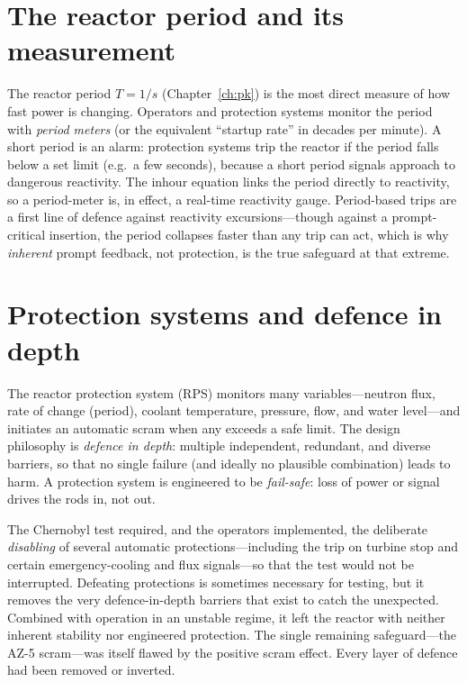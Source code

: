\section{The reactor period and its measurement}

The reactor period $T=1/s$ (Chapter~\ref{ch:pk}) is the most direct measure of how
fast power is changing. Operators and protection systems monitor the period with
\emph{period meters} (or the equivalent ``startup rate'' in decades per minute). A
short period is an alarm: protection systems trip the reactor if the period falls
below a set limit (e.g.\ a few seconds), because a short period signals approach to
dangerous reactivity. The inhour equation links the period directly to reactivity,
so a period-meter is, in effect, a real-time reactivity gauge. Period-based trips
are a first line of defence against reactivity excursions---though against a
prompt-critical insertion, the period collapses faster than any trip can act, which
is why \emph{inherent} prompt feedback, not protection, is the true safeguard at
that extreme.

\section{Protection systems and defence in depth}

The reactor protection system (RPS) monitors many variables---neutron flux, rate
of change (period), coolant temperature, pressure, flow, and water level---and
initiates an automatic scram when any exceeds a safe limit. The design philosophy
is \emph{defence in depth}: multiple independent, redundant, and diverse barriers,
so that no single failure (and ideally no plausible combination) leads to harm.
A protection system is engineered to be \emph{fail-safe}: loss of power or signal
drives the rods in, not out.

\begin{remark}
The Chernobyl test required, and the operators implemented, the deliberate
\emph{disabling} of several automatic protections---including the trip on turbine
stop and certain emergency-cooling and flux signals---so that the test would not be
interrupted. Defeating protections is sometimes necessary for testing, but it
removes the very defence-in-depth barriers that exist to catch the unexpected.
Combined with operation in an unstable regime, it left the reactor with neither
inherent stability nor engineered protection. The single remaining safeguard---the
AZ-5 scram---was itself flawed by the positive scram effect. Every layer of defence
had been removed or inverted.
\end{remark}

